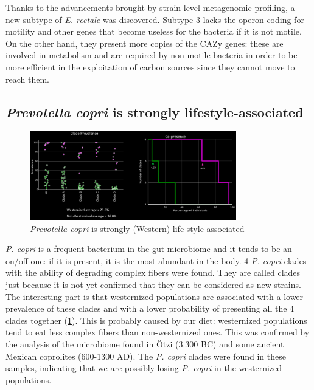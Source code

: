     Thanks to the advancements brought by strain-level metagenomic profiling, a new subtype of \emph{E. rectale} was discovered.
    Subtype 3 lacks the operon coding for motility and other genes that become useless for the bacteria if it is not motile.
    On the other hand, they present more copies of the CAZy genes: these are involved in metabolism and are required by non-motile bacteria in order to be more efficient in the exploitation of carbon sources since they cannot move to reach them.

    \subsection{\emph{Prevotella copri} is strongly lifestyle-associated}

        \begin{figure}[!h]
            \centering
            \includegraphics[width=0.8\textwidth]{Prevotella.png}
            \caption{\label{fig:prevotella}\emph{Prevotella copri} is strongly (Western) life-style associated}
        \end{figure}

    \emph{P. copri} is a frequent bacterium in the gut microbiome and it tends to be an on/off one: if it is present, it is the most abundant in the body.
    4 \emph{P. copri} clades with the ability of degrading complex fibers were found.
    They are called clades just because it is not yet confirmed that they can be considered as new strains.
    The interesting part is that westernized populations are associated with a lower prevalence of these clades and with a lower probability of presenting all the $4$ clades together (\ref{fig:prevotella}).
    This is probably caused by our diet: westernized populations tend to eat less complex fibers than non-westernized ones.
    This was confirmed by the analysis of the microbiome found in \"Otzi (3.300 BC) and some ancient Mexican coprolites (600-1300 AD).
    The \emph{P. copri} clades were found in these samples, indicating that we are possibly losing \emph{P. copri} in the westernized populations.

